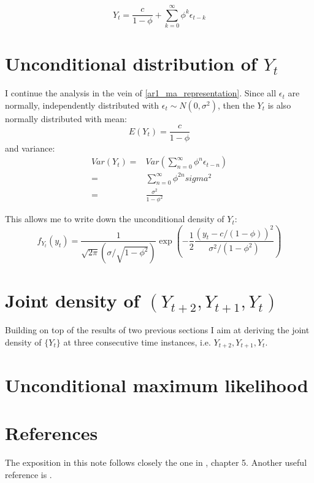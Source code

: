 \documentclass[12pt]{article}
\begin{document}
\begin{equation*}
\label{ar1_ma_representation}
Y_t =  \frac{c}{1 - \phi} +
\sum_{k=0}^{\infty} \phi^k \epsilon_{t-k}
\end{equation*}


\section{Unconditional distribution of $Y_t$}
I continue the analysis in the vein of \eqref{ar1_ma_representation}. Since 
all $\epsilon_t$ are normally, independently distributed with 
$\epsilon_t \sim N(0, \sigma^2)$, then the $Y_t$ is also normally distributed
with mean:
\begin{equation*}
E(Y_t) = \frac{c}{1 - \phi}
\end{equation*}
and variance:
\begin{eqnarray*}
Var(Y_t) = & Var(\sum_{n=0}^{\infty} \phi^n \epsilon_{t-n}) \\
= & \sum_{n=0}^{\infty} \phi^{2n} sigma^2 \\
= & \frac{\sigma^2}{1 - \phi^2}
\end{eqnarray*}

This allows me to write down the unconditional density of $Y_t$:
\begin{equation*}
f_{Y_t}(y_t) = \frac{1}{\sqrt{2 \pi} (\sigma / \sqrt{1-\phi^2})}
\exp \left( 
- \frac{1}{2} 
\frac{(y_t - c/(1-\phi))^2}{\sigma^2/(1-\phi^2)}
\right)
\end{equation*}


\section{Joint density of $(Y_{t+2}, Y_{t+1}, Y_t)$}
Building on top of the results of two previous sections I aim at deriving the joint 
density of $\{Y_t\}$ at three consecutive time instances, i.e. $Y_{t+2}, Y_{t+1}, Y_t$.


\section{Unconditional maximum likelihood}


\section{References}
The exposition in this note follows closely the one in \cite{hamilton_tsa}, chapter 5. 
Another useful reference is \cite{fuller_intro_tsa}.



\end{document}
